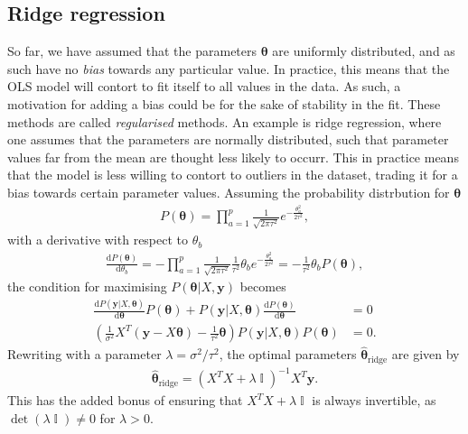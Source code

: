 \documentclass[twocolumn,english,notitlepage]{article}
\renewcommand{\d}[2][x]{\ensuremath{\frac{\mathrm{d}#2}{\mathrm{d}#1}}}
\renewcommand{\vec}[1]{\boldsymbol{#1}}
\newcommand{\pclosed}[1]{\left(#1\right)}
\renewcommand{\exp}[1]{e^{#1}}
\DeclareMathOperator{\eye}{\mathbb{I}}
\newcommand{\msub}[2]{\ensuremath{{#1}_\text{#2}}}
\begin{document}
    \subsection{Ridge regression}
        So far, we have assumed that the parameters $\vec{\theta}$ are uniformly distributed, and as such have no \textit{bias} towards any particular value. In practice, this means that the OLS model will contort to fit itself to all values in the data. As such, a motivation for adding a bias could be for the sake of stability in the fit. These methods are called \textit{regularised} methods. An example is ridge regression, where one assumes that the parameters are normally distributed, such that parameter values far from the mean are thought less likely to occurr. This in practice means that the model is less willing to contort to outliers in the dataset, trading it for a bias towards certain parameter values. Assuming the probability distrbution for $\vec{\theta}$
        \begin{align}
            P(\vec{\theta}) = \prod_{a=1}^{p} \frac{1}{\sqrt{2\pi\tau^2}} \exp{-\frac{\theta_a^2}{2\tau^2}},
        \end{align}
        with a derivative with respect to $\theta_b$
        \begin{align}
            \d[\theta_b]{P(\vec{\theta})} = -\prod_{a=1}^{p} \frac{1}{\sqrt{2\pi\tau^2}} \frac{1}{\tau^2} \theta_b \exp{-\frac{\theta_a^2}{2\tau^2}} = -\frac{1}{\tau^2} \theta_b P(\vec{\theta}),
        \end{align}
        the condition for maximising $P(\vec{\theta}|X, \vec{y})$ becomes
        \begin{align} \nonumber
            \d[\vec{\theta}]{P(\vec{y}|X, \vec{\theta})} P(\vec{\theta}) + P(\vec{y}|X, \vec{\theta}) \d[\vec{\theta}]{P(\vec{\theta})} &= 0 \\
            \pclosed{ \frac{1}{\sigma^2} X^T(\vec{y}-X\vec{\theta}) - \frac{1}{\tau^2} \vec{\theta} } P(\vec{y}|X,\vec{\theta}) P(\vec{\theta}) &= 0.
        \end{align}
        Rewriting with a parameter $\lambda = \sigma^2/\tau^2$, the optimal parameters $\msub{\vec{\hat{\theta}}}{ridge}$ are given by
        \begin{align}
            \boxed{
            \msub{\vec{\hat{\theta}}}{ridge} = \pclosed{X^TX + \lambda \eye}^{-1} X^T \vec{y}.
            }
        \end{align}
        This has the added bonus of ensuring that $X^TX + \lambda \eye$ is always invertible, as $\det(\lambda \eye) \neq 0$ for $\lambda>0$.
\end{document}
